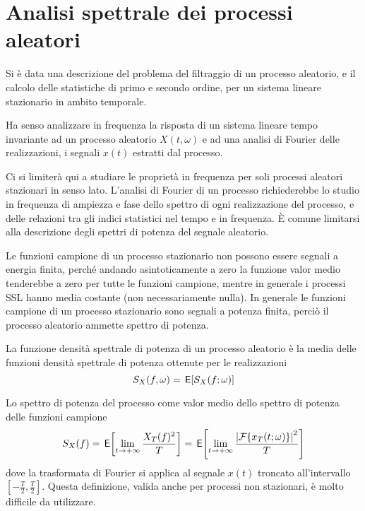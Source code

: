 \chapter{Analisi spettrale dei processi aleatori}
Si è data una descrizione del problema del filtraggio di un processo aleatorio, e il calcolo delle statistiche di primo e secondo ordine, per un sistema lineare stazionario in ambito temporale.

Ha senso analizzare in frequenza la risposta di un sistema lineare tempo invariante ad un processo aleatorio $X(t,\omega)$ e ad una analisi di Fourier delle realizzazioni, i segnali $x(t)$ estratti dal processo.

Ci si limiterà qui a studiare le proprietà in frequenza per soli processi aleatori stazionari in senso lato. L'analisi di Fourier di un processo richiederebbe lo studio in frequenza di ampiezza e fase dello spettro di ogni realizzazione del processo, e delle relazioni tra gli indici statistici nel tempo e in frequenza.
\`{E} comune limitarsi alla descrizione degli spettri di potenza del segnale aleatorio.

Le funzioni campione di un processo stazionario non possono essere segnali a energia finita, perché andando asintoticamente a zero la funzione valor medio tenderebbe a zero per tutte le funzioni campione, mentre in generale i processi SSL hanno media costante (non necessariamente nulla).
In generale le funzioni campione di un processo stazionario sono segnali a potenza finita, perciò il processo aleatorio ammette spettro di potenza.

La funzione densità spettrale di potenza di un processo aleatorio è la media delle funzioni densità spettrale di potenza ottenute per le realizzazioni
\begin{equation}
S_X(f,\omega)=\,{\operatorname{\mathsf{E}}}\!\left[{S_X(f;\omega)}\right]
\end{equation}

Lo spettro di potenza del processo come valor medio dello spettro di potenza delle funzioni campione
\begin{equation}\label{eq:densita_spettrale_processo_aleatorio}S_X(f)=\,{\operatorname{\mathsf{E}}}\!\left[{\lim\limits_{t\to+\infty}\frac{X_T(f)^2}{T}}\right]=\,{\operatorname{\mathsf{E}}}\!\left[{\lim\limits_{t\to+\infty}\frac{\left|{\operatorname{\mathcal{F}}\!\left\lbrace{x_T(t;\omega)}\right\rbrace}\right|^2}{T}}\right]\end{equation}
dove la trasformata di Fourier si applica al segnale $x(t)$ troncato all'intervallo $[-\frac{T}{2},\frac{T}{2}]$.
Questa definizione, valida anche per processi non stazionari, è molto difficile da utilizzare.

